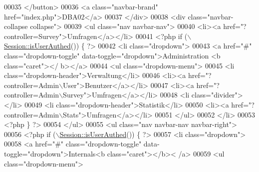 \begin{DoxyCode}
00035           </button>
00036           <a \textcolor{keyword}{class}=\textcolor{stringliteral}{"navbar-brand"} href=\textcolor{stringliteral}{"index.php"}>DBA02</a>
00037         </div>
00038         <div \textcolor{keyword}{class}=\textcolor{stringliteral}{"navbar-collapse collapse"}>
00039           <ul \textcolor{keyword}{class}=\textcolor{stringliteral}{"nav navbar-nav"}>
00040             <li><a href=\textcolor{stringliteral}{"?controller=Survey"}>Umfragen</a></li>
00041             <?php \textcolor{keywordflow}{if} (\(\backslash\)\hyperlink{class_session_a23cee49624385c6af65af96fb1c682f6}{Session::isUserAuthed}()) \{ ?>
00042             <li \textcolor{keyword}{class}=\textcolor{stringliteral}{"dropdown"}>
00043               <a href=\textcolor{stringliteral}{"#"} \textcolor{keyword}{class}=\textcolor{stringliteral}{"dropdown-toggle"} data-toggle=\textcolor{stringliteral}{"dropdown"}>Administration <b \textcolor{keyword}{class}=\textcolor{stringliteral}{"caret"}></
      b></a>
00044               <ul \textcolor{keyword}{class}=\textcolor{stringliteral}{"dropdown-menu"}>
00045                 <li \textcolor{keyword}{class}=\textcolor{stringliteral}{"dropdown-header"}>Verwaltung</li>
00046                 <li><a href=\textcolor{stringliteral}{"?controller=Admin\(\backslash\)User"}>Benutzer</a></li>
00047                 <li><a href=\textcolor{stringliteral}{"?controller=Admin\(\backslash\)Survey"}>Umfragen</a></li>
00048                 <li \textcolor{keyword}{class}=\textcolor{stringliteral}{"divider"}></li>
00049                 <li \textcolor{keyword}{class}=\textcolor{stringliteral}{"dropdown-header"}>Statistik</li>
00050                 <li><a href=\textcolor{stringliteral}{"?controller=Admin\(\backslash\)Stats"}>Umfragen</a></li>
00051               </ul>
00052             </li>
00053             <?php \} ?>
00054           </ul>
00055           <ul \textcolor{keyword}{class}=\textcolor{stringliteral}{"nav navbar-nav navbar-right"}>
00056             <?php \textcolor{keywordflow}{if} (\(\backslash\)\hyperlink{class_session_a23cee49624385c6af65af96fb1c682f6}{Session::isUserAuthed}()) \{ ?>
00057                 <li \textcolor{keyword}{class}=\textcolor{stringliteral}{"dropdown"}>
00058                  <a href=\textcolor{stringliteral}{"#"} \textcolor{keyword}{class}=\textcolor{stringliteral}{"dropdown-toggle"} data-toggle=\textcolor{stringliteral}{"dropdown"}>Internals<b \textcolor{keyword}{class}=\textcolor{stringliteral}{"caret"}></b><
      /a>
00059                  <ul \textcolor{keyword}{class}=\textcolor{stringliteral}{"dropdown-menu"}>

\end{DoxyCode}
